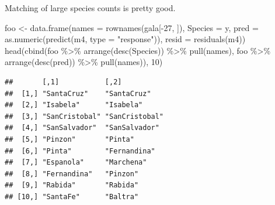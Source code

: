 \documentclass[
  ignorenonframetext,
]{beamer}
\newenvironment{Shaded}{\begin{snugshade}}{\end{snugshade}}
\newcommand{\AttributeTok}[1]{\textcolor[rgb]{0.77,0.63,0.00}{#1}}
\newcommand{\DecValTok}[1]{\textcolor[rgb]{0.00,0.00,0.81}{#1}}
\newcommand{\FunctionTok}[1]{\textcolor[rgb]{0.00,0.00,0.00}{#1}}
\newcommand{\NormalTok}[1]{#1}
\newcommand{\OtherTok}[1]{\textcolor[rgb]{0.56,0.35,0.01}{#1}}
\newcommand{\SpecialCharTok}[1]{\textcolor[rgb]{0.00,0.00,0.00}{#1}}
\newcommand{\StringTok}[1]{\textcolor[rgb]{0.31,0.60,0.02}{#1}}
\begin{document}
\begin{frame}[fragile]{}
\protect\hypertarget{section-18}{}
Matching of large species counts is pretty good.

\vspace{12pt}
\tiny

\begin{Shaded}
\begin{Highlighting}[]
\NormalTok{foo }\OtherTok{\textless{}{-}} \FunctionTok{data.frame}\NormalTok{(}\AttributeTok{names =} \FunctionTok{rownames}\NormalTok{(gala[}\SpecialCharTok{{-}}\DecValTok{27}\NormalTok{, ]),}
                  \AttributeTok{Species =}\NormalTok{ y,}
                  \AttributeTok{pred =} \FunctionTok{as.numeric}\NormalTok{(}\FunctionTok{predict}\NormalTok{(m4, }\AttributeTok{type =} \StringTok{"response"}\NormalTok{)), }
                  \AttributeTok{resid =} \FunctionTok{residuals}\NormalTok{(m4))}
\FunctionTok{head}\NormalTok{(}\FunctionTok{cbind}\NormalTok{(foo }\SpecialCharTok{\%\textgreater{}\%} \FunctionTok{arrange}\NormalTok{(}\FunctionTok{desc}\NormalTok{(Species)) }\SpecialCharTok{\%\textgreater{}\%} \FunctionTok{pull}\NormalTok{(names),}
\NormalTok{           foo }\SpecialCharTok{\%\textgreater{}\%} \FunctionTok{arrange}\NormalTok{(}\FunctionTok{desc}\NormalTok{(pred)) }\SpecialCharTok{\%\textgreater{}\%} \FunctionTok{pull}\NormalTok{(names)), }\DecValTok{10}\NormalTok{)}
\end{Highlighting}
\end{Shaded}

\begin{verbatim}
##       [,1]           [,2]          
##  [1,] "SantaCruz"    "SantaCruz"   
##  [2,] "Isabela"      "Isabela"     
##  [3,] "SanCristobal" "SanCristobal"
##  [4,] "SanSalvador"  "SanSalvador" 
##  [5,] "Pinzon"       "Pinta"       
##  [6,] "Pinta"        "Fernandina"  
##  [7,] "Espanola"     "Marchena"    
##  [8,] "Fernandina"   "Pinzon"      
##  [9,] "Rabida"       "Rabida"      
## [10,] "SantaFe"      "Baltra"
\end{verbatim}
\end{frame}
\end{document}
